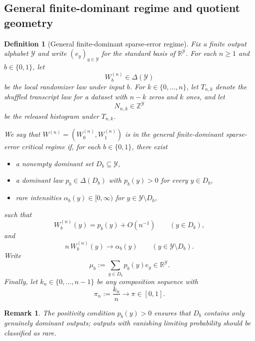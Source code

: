 \documentclass{article}
\newtheorem{definition}[theorem]{Definition}
\newtheorem{remark}[theorem]{Remark}
\newcommand{\1}{\mathbf 1}
\begin{document}
\subsection{General finite-dominant regime and quotient geometry}

\begin{definition}[General finite-dominant sparse-error regime]
\label{def:general-k-dominant}
Fix a finite output alphabet $\mathcal Y$ and write $(e_y)_{y\in\mathcal Y}$ for the standard basis of
$\mathbb R^{\mathcal Y}$. For each $n\ge 1$ and $b\in\{0,1\}$, let
\[
W_b^{(n)} \in \Delta(\mathcal Y)
\]
be the local randomizer law under input $b$.
For $k\in\{0,\dots,n\}$, let $T_{n,k}$ denote the shuffled transcript law for a dataset with
$n-k$ zeros and $k$ ones, and let
\[
N_{n,k}\in \mathbb Z^{\mathcal Y}
\]
be the released histogram under $T_{n,k}$.

We say that $W^{(n)}=(W_0^{(n)},W_1^{(n)})$ is in the
\emph{general finite-dominant sparse-error critical regime} if, for each $b\in\{0,1\}$, there exist

\begin{itemize}
\item a nonempty dominant set $D_b\subseteq \mathcal Y$,
\item a dominant law $p_b\in \Delta(D_b)$ with $p_b(y)>0$ for every $y\in D_b$,
\item rare intensities $\alpha_b(y)\in[0,\infty)$ for $y\in \mathcal Y\setminus D_b$,
\end{itemize}

such that
\begin{equation}
W_b^{(n)}(y)=p_b(y)+O(n^{-1})
\qquad (y\in D_b),
\label{eq:gen-dom-dominant}
\end{equation}
and
\begin{equation}
n\,W_b^{(n)}(y)\longrightarrow \alpha_b(y)
\qquad (y\in \mathcal Y\setminus D_b).
\label{eq:gen-dom-rare}
\end{equation}
Write
\[
\mu_b:=\sum_{y\in D_b} p_b(y)e_y\in \mathbb R^{\mathcal Y}.
\]
Finally, let $k_n\in\{0,\dots,n-1\}$ be any composition sequence with
\[
\pi_n:=\frac{k_n}{n}\longrightarrow \pi\in[0,1].
\]
\end{definition}

\begin{remark}
The positivity condition $p_b(y)>0$ ensures that $D_b$ contains only genuinely dominant outputs; outputs with vanishing limiting probability should be classified as rare.
\end{remark}
\end{document}
